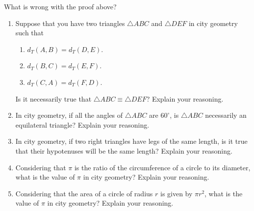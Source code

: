 \begin{question} What is wrong with the proof above? 
\end{question}
\QM




\begin{problems}
\begin{enumerate}
\item Suppose that you have two triangles $\triangle ABC$ and $\triangle DEF$ in  city geometry such that
\begin{enumerate}
\item $d_T(A,B) = d_T(D,E)$.
\item $d_T(B,C) = d_T(E,F)$.
\item $d_T(C,A) = d_T(F,D)$.
\end{enumerate} 
Is it necessarily true that $\triangle ABC \equiv \triangle DEF$? Explain your reasoning.
\item In city geometry, if all the angles of $\triangle ABC$ are
  $60^\circ$, is $\triangle ABC$ necessarily an equilateral triangle?
  Explain your reasoning.
\item In city geometry, if two right triangles have legs of the same
  length, is it true that their hypotenuses will be the same length?
  Explain your reasoning.
\item Considering that $\pi$ is the ratio of the circumference of a
  circle to its diameter, what is the value of $\pi$ in city geometry?
  Explain your reasoning.

\item Considering that the area of a circle of radius $r$ is given by
  $\pi r^2$, what is the value of $\pi$ in city geometry? Explain your
  reasoning.


\end{enumerate}
\end{problems}

